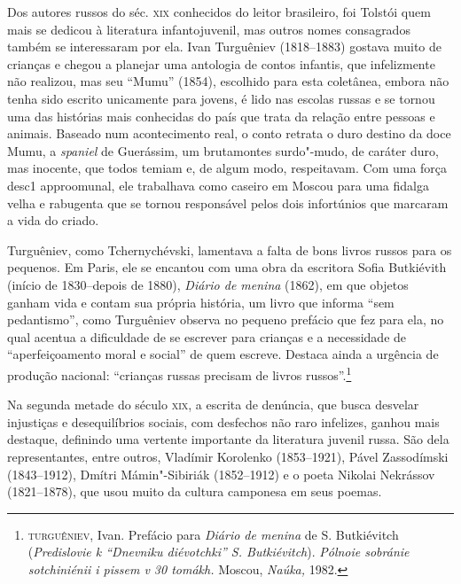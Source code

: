 Dos autores russos do séc. \textsc{xix} conhecidos do leitor brasileiro, foi
Tolstói quem mais se dedicou à literatura infantojuvenil, mas outros
nomes consagrados também se interessaram por ela. Ivan Turguêniev (1818--1883) gostava muito de crianças e chegou a planejar uma antologia de
contos infantis, que infelizmente não realizou, mas seu ``Mumu''
(1854), escolhido para esta coletânea, embora não tenha sido
escrito unicamente para jovens, é lido nas escolas russas e se tornou
uma das histórias mais conhecidas do país que trata da relação entre
pessoas e animais. Baseado num acontecimento real, o conto retrata o duro
destino da doce Mumu, a \emph{spaniel} de Guerássim, um brutamontes
surdo"-mudo, de caráter duro, mas inocente, que todos temiam e, de algum
modo, respeitavam. Com uma força desc1 approomunal, ele trabalhava como caseiro
em Moscou para uma fidalga velha e rabugenta que se tornou responsável
pelos dois infortúnios que marcaram a vida do criado.

Turguêniev, como Tchernychévski, lamentava a falta de bons livros russos
para os pequenos. Em Paris, ele se encantou com uma obra da escritora
Sofia Butkiévith (início de 1830--depois de 1880), \emph{Diário de
menina} (1862), em que objetos ganham vida e contam sua própria
história, um livro que informa ``sem pedantismo'', como Turguêniev
observa no pequeno prefácio que fez para ela, no qual acentua a
dificuldade de se escrever para crianças e a necessidade de
``aperfeiçoamento moral e social'' de quem escreve. Destaca ainda a
urgência de produção nacional: ``crianças russas precisam de livros
russos''.\footnote{\textsc{turguêniev}, Ivan. Prefácio para \emph{Diário de menina}
  de S. Butkiévitch (\emph{Predislovie k “Dnevniku diévotchki” S. Butkiévitch}). \emph{Pólnoie sobránie sotchiniénii i pissem v 30 tomákh.} Moscou,
  \emph{Naúka,} 1982.}

Na segunda metade do século \textsc{xix}, a escrita de denúncia, que busca
desvelar injustiças e desequilíbrios sociais, com desfechos não raro
infelizes, ganhou mais destaque, definindo uma vertente importante da
literatura juvenil russa. São dela representantes, entre outros,
Vladímir Korolenko (1853--1921), Pável Zassodímski (1843--1912), Dmítri
Mámin"-Sibiriák (1852--1912) e o poeta Nikolai Nekrássov (1821--1878),
que usou muito da cultura camponesa em seus poemas.

